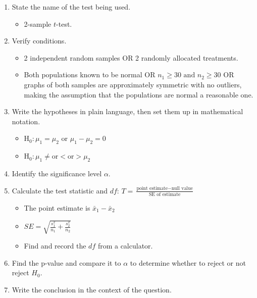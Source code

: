 \begin{termBox}{
\begin{enumerate}
\setlength{\itemsep}{0mm}
\item State the name of the test being used.\vspace{-1.5mm}
\begin{itemize}
\setlength{\itemsep}{0mm}
\item 2-sample $t$-test.
\end{itemize}
\item Verify conditions.\vspace{-1.5mm}
\begin{itemize}
\setlength{\itemsep}{0mm}
\item 2 independent random samples OR 2 randomly allocated treatments.
\item Both populations known to be normal OR $n_1 \ge 30 \text{ and } n_2\ge 30$ OR graphs of both samples are approximately symmetric with no outliers, making the assumption that the populations are normal a reasonable one.
\end{itemize}
\item Write the hypotheses in plain language, then set them up in mathematical notation.\vspace{-1.5mm}
\begin{itemize}
\setlength{\itemsep}{0mm}
\item H$_0: \mu_1 = \mu_2$ or  $\mu_1 - \mu_2 = 0$
\item H$_0: \mu_1 \ne \text{or} < \text{or} > \mu_2$
\end{itemize}
\item Identify the significance level $\alpha$.
\item Calculate the test statistic and $df$: $T = \frac{\text{point estimate} - \text{null value}}{\text{SE of estimate}}$
\begin{itemize}
\setlength{\itemsep}{0mm}
\item The point estimate is $\bar{x}_1-\bar{x}_2$
\item $SE = \sqrt{\frac{s^2_1}{n_1}+\frac{s^2_2}{n_2}}$
\item Find and record the $df$ from a calculator.
\end{itemize}
\item Find the p-value and compare it to $\alpha$ to determine whether to reject or not reject $H_0$.
\item Write the conclusion in the context of the question.
\end{enumerate}}
\end{termBox}

